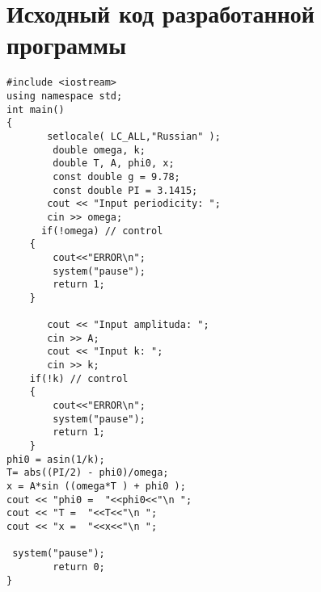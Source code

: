 \chapter{Исходный код разработанной программы}

\begin{lstlisting}[caption={Листинг программы разработанной на MathLab}, label={ls:a:01}]
#include <iostream>
using namespace std;
int main()
{
       setlocale( LC_ALL,"Russian" );
        double omega, k;
        double T, A, phi0, x;
        const double g = 9.78;
        const double PI = 3.1415;
       cout << "Input periodicity: ";
       cin >> omega;
      if(!omega) // control
    {
        cout<<"ERROR\n";
        system("pause");
        return 1;
    }
 
       cout << "Input amplituda: ";
       cin >> A;
       cout << "Input k: ";
       cin >> k;
    if(!k) // control
    {
        cout<<"ERROR\n";
        system("pause");
        return 1;
    }
phi0 = asin(1/k);
T= abs((PI/2) - phi0)/omega;
x = A*sin ((omega*T ) + phi0 );
cout << "phi0 =  "<<phi0<<"\n ";
cout << "T =  "<<T<<"\n ";
cout << "x =  "<<x<<"\n ";
 
 system("pause");
        return 0;
}
\end{lstlisting}